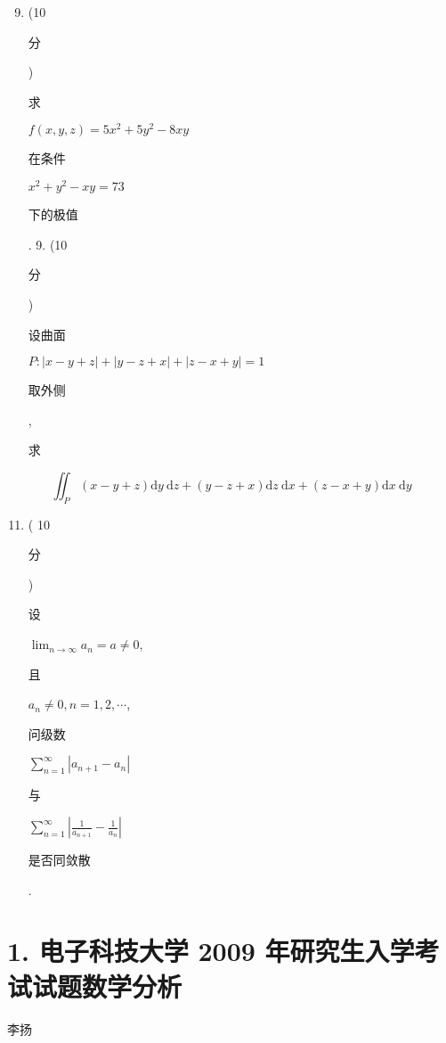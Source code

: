 \documentclass[10pt]{article}
\begin{document}
\begin{enumerate}
  \setcounter{enumi}{8}
  \item (10 \begin{CJK}{UTF8}{mj}分\end{CJK}) \begin{CJK}{UTF8}{mj}求\end{CJK} $f(x, y, z)=5 x^{2}+5 y^{2}-8 x y$ \begin{CJK}{UTF8}{mj}在条件\end{CJK} $x^{2}+y^{2}-x y=73$ \begin{CJK}{UTF8}{mj}下的极值\end{CJK}. 9. (10 \begin{CJK}{UTF8}{mj}分\end{CJK}) \begin{CJK}{UTF8}{mj}设曲面\end{CJK} $P:|x-y+z|+|y-z+x|+|z-x+y|=1$ \begin{CJK}{UTF8}{mj}取外侧\end{CJK}, \begin{CJK}{UTF8}{mj}求\end{CJK}
\end{enumerate}
$$
\iint_{P}(x-y+z) \mathrm{d} y \mathrm{~d} z+(y-z+x) \mathrm{d} z \mathrm{~d} x+(z-x+y) \mathrm{d} x \mathrm{~d} y
$$

\begin{enumerate}
  \setcounter{enumi}{10}
  \item ( 10 \begin{CJK}{UTF8}{mj}分\end{CJK}) \begin{CJK}{UTF8}{mj}设\end{CJK} $\lim _{n \rightarrow \infty} a_{n}=a \neq 0$, \begin{CJK}{UTF8}{mj}且\end{CJK} $a_{n} \neq 0, n=1,2, \cdots$, \begin{CJK}{UTF8}{mj}问级数\end{CJK} $\sum_{n=1}^{\infty}\left|a_{n+1}-a_{n}\right|$ \begin{CJK}{UTF8}{mj}与\end{CJK} $\sum_{n=1}^{\infty}\left|\frac{1}{a_{n+1}}-\frac{1}{a_{n}}\right|$ \begin{CJK}{UTF8}{mj}是否同敛散\end{CJK}.
\end{enumerate}
\section{1. 电子科技大学 2009 年研究生入学考试试题数学分析}
\begin{CJK}{UTF8}{mj}李扬\end{CJK}
\end{document}

